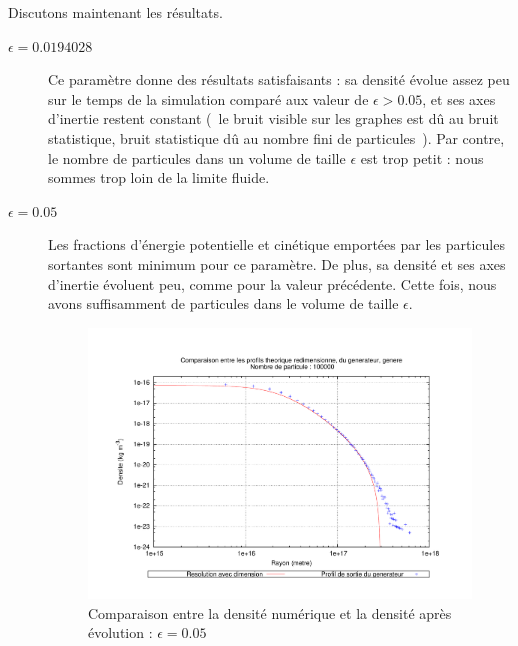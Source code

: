 	Discutons maintenant les résultats.

	\begin{description}
	\item[$\epsilon = 0.0194028$]
	Ce paramètre donne des résultats satisfaisants : sa densité évolue assez peu sur le temps de la simulation comparé aux valeur de $\epsilon > 0.05$, et ses axes d'inertie restent constant
	(~le bruit visible sur les graphes est dû au bruit statistique, bruit statistique dû au nombre fini de particules~). Par contre, le nombre de particules dans un volume de taille $\epsilon$ est trop petit : nous sommes trop loin de la limite fluide.

	\item[$\epsilon = 0.05$]
	Les fractions d'énergie potentielle et cinétique emportées par les particules sortantes sont minimum pour ce paramètre. De plus, sa densité et ses axes d'inertie évoluent peu, comme pour la valeur précédente.
	Cette fois, nous avons suffisamment de particules dans le volume de taille $\epsilon$.

\begin{figure}[h!]
	\centering \includegraphics[scale=0.5]{graphe/Comp_dens_gene-theo_0-05.pdf}
	\caption{Comparaison entre la densité numérique et la densité après évolution : $\epsilon = 0.05$\label{soft::0.05}}
\end{figure}


\end{description}

